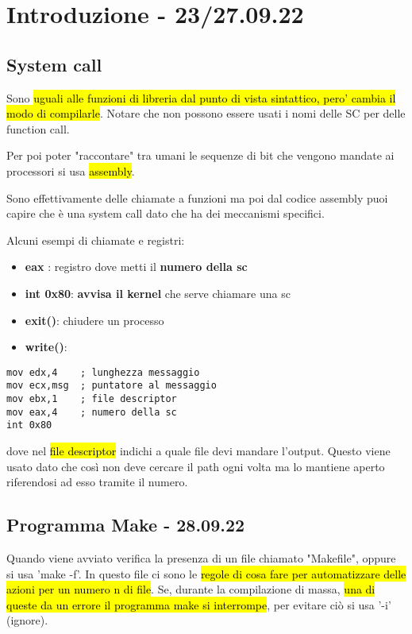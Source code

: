 
\section{Introduzione - 23/27.09.22}

\subsection{System call}

Sono \hl{uguali alle funzioni di libreria dal punto di vista sintattico, pero' cambia il modo di compilarle}. Notare che non possono essere usati i nomi delle SC per delle function call.

Per poi poter "raccontare" tra umani le sequenze di bit che vengono mandate ai processori si usa \hl{assembly}.

Sono effettivamente delle chiamate a funzioni ma poi dal codice assembly puoi capire che è una system call dato che ha dei meccanismi specifici.

Alcuni esempi di chiamate e registri:
\begin{itemize}
	\item \textbf{eax} : registro dove metti il \textbf{numero della sc}
	\item \textbf{int 0x80}: \textbf{avvisa il kernel} che serve chiamare una sc
	\item \textbf{exit()}: chiudere un processo
	\item \textbf{write()}:
\end{itemize}

\begin{lstlisting}
mov edx,4    ; lunghezza messaggio
mov ecx,msg  ; puntatore al messaggio
mov ebx,1    ; file descriptor
mov eax,4    ; numero della sc
int 0x80	
\end{lstlisting}

dove nel \hl{file descriptor} indichi a quale file devi mandare l'output. Questo viene usato dato che così non deve cercare il path ogni volta ma lo mantiene aperto riferendosi ad esso tramite il numero.


\subsection{Programma Make - 28.09.22}

Quando viene avviato verifica la presenza di un file chiamato "Makefile", oppure si usa 'make -f'. In questo file ci sono le \hl{regole di cosa fare per automatizzare delle azioni per un numero n di file}. Se, durante la compilazione di massa, \hl{una di queste da un errore il programma make si interrompe}, per evitare ciò si usa '-i' (ignore).


